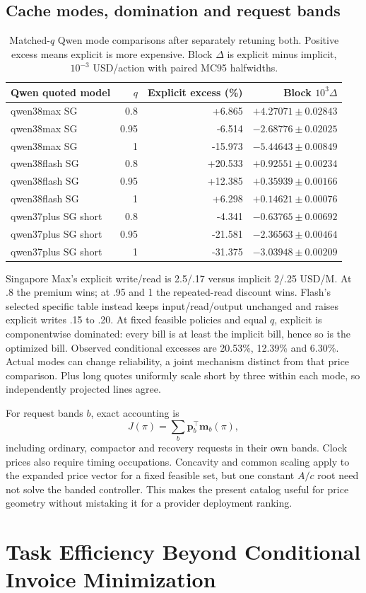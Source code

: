 \documentclass[sigconf,screen,nonacm]{acmart}
\makeatletter
\newcommand{\pp}{\boldsymbol{p}}
\newcommand{\Mvec}{\boldsymbol{m}}
\newcommand{\PaperCacheModes}{%
\begin{tabular}{@{}lrrr@{}}\toprule
Qwen quoted model & $q$ & Explicit excess (\%) & Block $10^3\Delta$\\\midrule
qwen38max SG & 0.8 & +6.865 & $+4.27071\pm0.02843$\\
qwen38max SG & 0.95 & -6.514 & $-2.68776\pm0.02025$\\
qwen38max SG & 1 & -15.973 & $-5.44643\pm0.00849$\\
qwen38flash SG & 0.8 & +20.533 & $+0.92551\pm0.00234$\\
qwen38flash SG & 0.95 & +12.385 & $+0.35939\pm0.00166$\\
qwen38flash SG & 1 & +6.298 & $+0.14621\pm0.00076$\\
qwen37plus SG short & 0.8 & -4.341 & $-0.63765\pm0.00692$\\
qwen37plus SG short & 0.95 & -21.581 & $-2.36563\pm0.00464$\\
qwen37plus SG short & 1 & -31.375 & $-3.03948\pm0.00209$\\\bottomrule
\end{tabular}}
\makeatother
\begin{document}
\subsection{Cache modes, domination and request bands}
\begin{table}[p]
\centering\small
\caption{Matched-$q$ Qwen mode comparisons after separately retuning both.
Positive excess means explicit is more expensive. Block $\Delta$ is
explicit minus implicit, $10^{-3}$ USD/action with paired MC95 halfwidths.}
\label{tab:cache-modes}\PaperCacheModes
\end{table}

Singapore Max's explicit write/read is 2.5/.17 versus implicit 2/.25
USD/M. At .8 the premium wins; at .95 and 1 the repeated-read discount
wins. Flash's selected specific table instead keeps input/read/output
unchanged and raises explicit writes .15 to .20. At fixed feasible
policies and equal $q$, explicit is componentwise dominated: every bill
is at least the implicit bill, hence so is the optimized bill. Observed
conditional excesses are 20.53\%, 12.39\% and 6.30\%.
Actual modes can change reliability, a joint mechanism distinct from
that price comparison. Plus long quotes uniformly scale short by three
within each mode, so independently projected lines agree.

For request bands $b$, exact accounting is
\begin{equation}
J(\pi)=\sum_b\pp_b^\top\Mvec_b(\pi),
\end{equation}
including ordinary, compactor
and recovery requests in their own bands. Clock prices also require
timing occupations. Concavity and common scaling apply to the expanded
price vector for a fixed feasible set, but one constant $A/c$ root need
not solve the banded controller. This makes the present catalog useful
for price geometry without mistaking it for a provider deployment ranking.

\section{Task Efficiency Beyond Conditional Invoice Minimization}
\label{app:task-efficiency}
\end{document}
